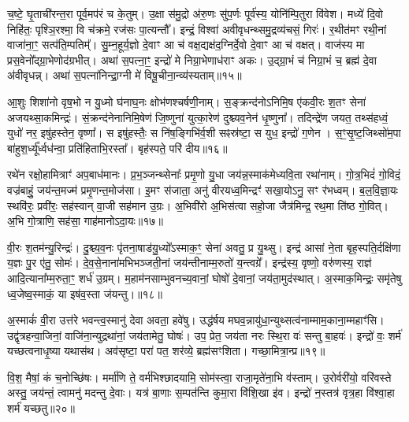 च॒ष्टे॒ घृ॒ताची॑रन्त॒रा पूर्व॒मप॑रं च के॒तुम्। उ॒क्षा स॑मु॒द्रो अ॑रु॒णः सु॑प॒र्णः पूर्व॑स्य॒ योनि॑म्पि॒तुरा वि॑वेश। मध्ये॑ दि॒वो निहि॑तः॒ पृश्ञि॒रश्मा॒ वि च॑क्रमे॒ रज॑सः पा॒त्यन्तौ᳚। इन्द्रं॒ विश्वा॑ अवीवृधन्थ्समु॒द्रव्य॑चसं॒ गिरः॑। र॒थीत॑मꣳ रथी॒नां वाजा॑ना॒ꣳ॒ सत्प॑ति॒म्पतिम्᳚। सु॒म्न॒हूर्य॒ज्ञो दे॒वाꣳ आ च॑ वक्ष॒द्यक्ष॑द॒ग्निर्दे॒वो दे॒वाꣳ आ च॑ वक्षत्। वाज॑स्य मा प्रस॒वेनो᳚द्ग्रा॒भेणोद॑ग्रभीत्। अथा॑ स॒पत्ना॒ꣳ॒ इन्द्रो॑ मे निग्रा॒भेणाध॑राꣳ अकः। उ॒द्ग्रा॒भं च॑ निग्रा॒भं च॒ ब्रह्म॑ दे॒वा अ॑वीवृधन्न्। अथा॑ स॒पत्ना॑निन्द्रा॒ग्नी मे॑ विषू॒चीना॒न्व्य॑स्यताम्॥१५॥

{\anuvakamend[{दे॒वाः श॒तप॑या अ॒भि वाज॑स्य॒ षड्विꣳ॑शतिश्च॥३॥}]}

आ॒शुः शिशा॑नो वृष॒भो न यु॒ध्मो घ॑नाघ॒नः क्षोभ॑णश्चर्\mbox{}षणी॒नाम्। स॒ङ्क्रन्द॑नो\-ऽनिमि॒ष ए॑कवी॒रः श॒तꣳ सेना॑ अजयथ्सा॒कमिन्द्रः॑। सं॒क्रन्द॑नेनानिमि॒षेण॑ जि॒ष्णुना॑ युत्का॒रेण॑ दुश्च्यव॒नेन॑ धृ॒ष्णुना᳚। तदिन्द्रे॑ण जयत॒ तथ्स॑हध्वं॒ युधो॑ नर॒ इषु॑हस्तेन॒ वृष्णा᳚। स इषु॑हस्तैः॒ स नि॑ष॒ङ्गिभि॑र्व॒शी सꣴस्र॑ष्टा॒ स युध॒ इन्द्रो॑ ग॒णेन। स॒ꣳ॒सृ॒ष्ट॒जिथ्सो॑म॒पा बा॑हुश॒र्ध्यू᳚र्ध्वध॑न्वा॒ प्रति॑हिताभि॒रस्ता᳚। बृह॑स्पते॒ परि॑ दीय॥१६॥

रथे॑न रक्षो॒हामित्राꣳ॑ अप॒बाध॑मानः। प्र॒भ॒ञ्जन्थ्सेनाः᳚ प्रमृ॒णो यु॒धा जय॑न्न॒स्माक॑मेध्यवि॒ता रथा॑नाम्। गो॒त्र॒भिदं॑ गो॒विदं॒ वज्र॑बाहुं॒ जय॑न्त॒मज्म॑ प्रमृ॒णन्त॒मोज॑सा। इ॒मꣳ स॑जाता॒ अनु॑ वीरयध्व॒मिन्द्रꣳ॑ सखा॒यो\-ऽनु॒ सꣳ र॑भध्वम्। ब॒ल॒वि॒ज्ञा॒यः स्थवि॑रः॒ प्रवी॑रः॒ सह॑स्वान् वा॒जी सह॑मान उ॒ग्रः। अ॒भिवी॑रो अ॒भिस॑त्वा सहो॒जा जैत्र॑मिन्द्र॒ रथ॒मा ति॑ष्ठ गो॒वित्। अ॒भि गो॒त्राणि॒ सह॑सा॒ गाह॑मानो\-ऽदा॒यः॥१७॥

वी॒रः श॒तम॑न्यु॒रिन्द्रः॑। दु॒श्च्य॒व॒नः पृ॑तना॒षाड॑यु॒ध्यो᳚\-ऽस्माक॒ꣳ॒ सेना॑ अवतु॒ प्र यु॒थ्सु। इन्द्र॑ आसां ने॒ता बृह॒स्पति॒र्दक्षि॑णा य॒ज्ञः पु॒र ए॑तु॒ सोमः॑। दे॒व॒से॒नाना॑मभिभञ्जती॒नां जय॑न्तीनाम्म॒रुतो॑ य॒न्त्वग्रे᳚। इन्द्र॑स्य॒ वृष्णो॒ वरु॑णस्य॒ राज्ञ॑ आदि॒त्याना᳚म्म॒रुता॒ꣳ॒ शर्ध॑ उ॒ग्रम्। म॒हाम॑नसाम्भुवनच्य॒वानां॒ घोषो॑ दे॒वानां॒ जय॑ता॒मुद॑स्थात्। अ॒स्माक॒मिन्द्रः॒ समृ॑तेषु ध्व॒जेष्व॒स्माकं॒ या इष॑व॒स्ता ज॑यन्तु।॥१८॥

अ॒स्माकं॑ वी॒रा उत्त॑रे भवन्त्व॒स्मानु॑ देवा अवता॒ हवे॑षु। उद्ध॑र्\mbox{}षय मघव॒न्नायु॑धा॒न्युथ्सत्व॑नाम्माम॒काना॒म्महाꣳ॑सि। उद्वृ॑त्रहन्वा॒जिनां॒ वाजि॑ना॒न्युद्रथा॑नां॒ जय॑तामेतु॒ घोषः॑। उप॒ प्रेत॒ जय॑ता नरः स्थि॒रा वः॑ सन्तु बा॒हवः॑। इन्द्रो॑ वः॒ शर्म॑ यच्छत्वनाधृ॒ष्या यथास॑थ। अव॑सृष्टा॒ परा॑ पत॒ शर॑व्ये॒ ब्रह्म॑सꣳशिता। गच्छा॒मित्रा॒न्प्र॥१९॥

वि॒श॒ मैषां॒ कं च॒नोच्छि॑षः। मर्मा॑णि ते॒ वर्म॑भिश्छादयामि॒ सोम॑स्त्वा॒ राजा॒मृते॑ना॒भि व॑स्ताम्। उ॒रोर्वरी॑यो॒ वरि॑वस्ते अस्तु॒ जय॑न्तं॒ त्वामनु॑ मदन्तु दे॒वाः। यत्र॑ बा॒णाः स॒म्पत॑न्ति कुमा॒रा वि॑शि॒खा इ॑व। इन्द्रो॑ न॒स्तत्र॑ वृत्र॒हा वि॑श्वा॒हा शर्म॑ यच्छतु॥२०॥


